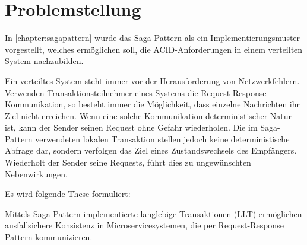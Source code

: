 \section{Problemstellung} \label{sec:problemstellung}

In \cref{chapter:sagapattern} wurde das Saga-Pattern als ein Implementierungsmuster vorgestellt, welches ermöglichen soll, die ACID-Anforderungen in einem verteilten System nachzubilden. 

Ein verteiltes System steht immer vor der Herausforderung von Netzwerkfehlern. Verwenden Transaktionsteilnehmer eines Systems die Request-Response-Kommunikation, so besteht immer die Möglichkeit, dass einzelne Nachrichten ihr Ziel nicht erreichen. Wenn eine solche Kommunikation deterministischer Natur ist, kann der Sender seinen Request ohne Gefahr wiederholen. Die im Saga-Pattern verwendeten lokalen Transaktion stellen jedoch keine deterministische Abfrage dar, sondern verfolgen das Ziel eines Zustandswechsels des Empfängers. Wiederholt der Sender seine Requests, führt dies zu ungewünschten Nebenwirkungen.

Es wird folgende These formuliert:

\begin{thesis*} 
	Mittels Saga-Pattern implementierte langlebige Transaktionen (LLT) ermöglichen ausfallsichere Konsistenz in Microservicesystemen, die per Request-Response Pattern kommunizieren. 	
\end{thesis*}